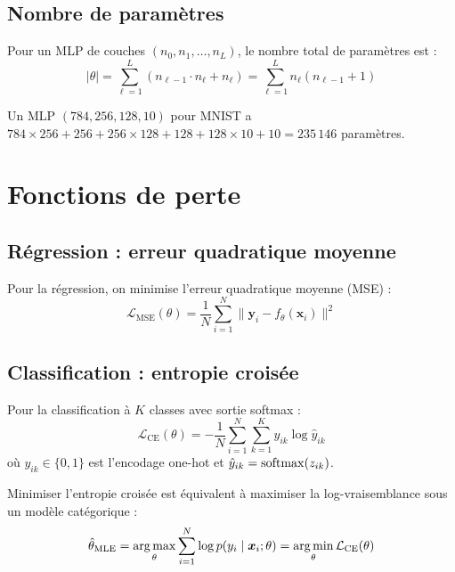 \subsection{Nombre de param\`etres}

Pour un MLP de couches $(n_0, n_1, \ldots, n_L)$, le nombre total de param\`etres est :
\[
|\theta| = \sum_{\ell=1}^{L} (n_{\ell-1} \cdot n_\ell + n_\ell) = \sum_{\ell=1}^{L} n_\ell(n_{\ell-1} + 1)
\]

\begin{exemple}
Un MLP $(784, 256, 128, 10)$ pour MNIST a $784 \times 256 + 256 + 256 \times 128 + 128 + 128 \times 10 + 10 = 235\,146$ param\`etres.
\end{exemple}

\section{Fonctions de perte}
\label{sec:perte}

\subsection{R\'egression : erreur quadratique moyenne}

Pour la r\'egression, on minimise l'erreur quadratique moyenne (MSE) :
\[
\mathcal{L}_{\mathrm{MSE}}(\theta) = \frac{1}{N} \sum_{i=1}^{N} \|\bm{y}_i - f_\theta(\bm{x}_i)\|^2
\]

\subsection{Classification : entropie crois\'ee}

Pour la classification \`a $K$ classes avec sortie softmax :
\[
\mathcal{L}_{\mathrm{CE}}(\theta) = -\frac{1}{N}\sum_{i=1}^{N} \sum_{k=1}^{K} y_{ik} \log \hat{y}_{ik}
\]
o\`u $y_{ik} \in \{0,1\}$ est l'encodage one-hot et $\hat{y}_{ik} = \mathrm{softmax}(z_{ik})$.

\begin{mathbox}[title=\textbf{Lien avec le maximum de vraisemblance}]
Minimiser l'entropie crois\'ee est \'equivalent \`a maximiser la log-vraisemblance sous un mod\`ele cat\'egorique :
\[
\hat{\theta}_{\mathrm{MLE}} = \operatorname*{arg\,max}_\theta \sum_{i=1}^N \log p(y_i \mid \bm{x}_i; \theta) = \operatorname*{arg\,min}_\theta \mathcal{L}_{\mathrm{CE}}(\theta)
\]
\end{mathbox}

